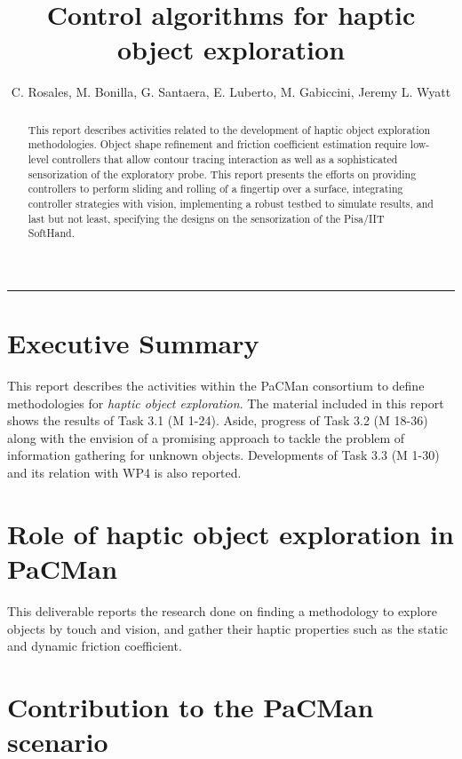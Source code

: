 \documentclass[a4paper,11pt,pdf]{pacmanreport}
\title{Control algorithms for haptic object exploration}
\author{C. Rosales, M. Bonilla, G. Santaera, E. Luberto, M. Gabiccini, Jeremy L. Wyatt}
\begin{document}
\maketitle

\begin{abstract}
\noindent This report describes activities related to the development of haptic object exploration methodologies. Object shape refinement and friction coefficient estimation require low-level controllers that allow contour tracing interaction as well as a sophisticated sensorization of the exploratory probe. This report presents the efforts on providing controllers to perform sliding and rolling of a fingertip over a surface, integrating controller strategies with vision, implementing a robust testbed to simulate results, and last but not least, specifying the designs on the sensorization of the Pisa/IIT SoftHand.
\end{abstract}

\vspace{.2em}
\hrule

\footnotesize

\tableofcontents

\normalsize

\newpage

\section*{Executive Summary}
This report describes the activities within the PaCMan consortium to define methodologies for \emph{haptic object exploration}. The material included in this report shows the results of Task 3.1 (M 1-24). Aside, progress of Task 3.2 (M 18-36) along with the envision of a promising approach to tackle the problem of information gathering for unknown objects. Developments of Task 3.3 (M 1-30) and its relation with WP4 is also reported.

\section*{Role of haptic object exploration in PaCMan}

This deliverable reports the research done on finding a methodology to explore objects by touch and vision, and gather their haptic properties such as the static and dynamic friction coefficient.

\section*{Contribution to the PaCMan scenario}
\end{document}
